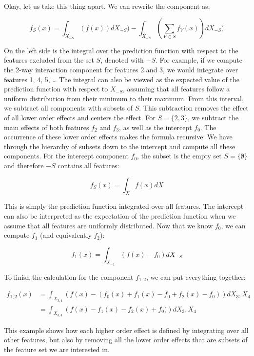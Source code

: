 \documentclass[12pt,]{krantz}
\begin{document}
Okay, let us take this thing apart. We can rewrite the component as:

\[f_S(x) = \int_{X_{-S}} \left( f(x)\right) d X_{-S}) - \int_{X_{-S}} \left(\sum_{V \subset S} f_V(x) \right) d X_{-S})\]

On the left side is the integral over the prediction function with
respect to the features excluded from the set \(S\), denoted with
\(-S\). For example, if we compute the 2-way interaction component for
features 2 and 3, we would integrate over features 1, 4, 5, \ldots{} The
integral can also be viewed as the expected value of the prediction
function with respect to \(X_{-S}\), assuming that all features follow a
uniform distribution from their minimum to their maximum. From this
interval, we subtract all components with subsets of \(S\). This
subtraction removes the effect of all lower order effects and centers
the effect. For \(S=\{2,3\}\), we subtract the main effects of both
features \(f_2\) and \(f_3\), as well as the intercept \(f_0\). The
occurrence of these lower order effects makes the formula recursive: We
have through the hierarchy of subsets down to the intercept and compute
all these components. For the intercept component \(f_0\), the subset is
the empty set \(S=\{\emptyset\}\) and therefore \(-S\) contains all
features:

\[f_S(x) = \int_{X} f(x) dX\]

This is simply the prediction function integrated over all features. The
intercept can also be interpreted as the expectation of the prediction
function when we assume that all features are uniformly distributed. Now
that we know \(f_0\), we can compute \(f_1\) (and equivalently \(f_2\)):

\[f_1(x) = \int_{X_{-1}} \left( f(x) - f_0\right) d X_{-S}\]

To finish the calculation for the component \(f_{1,2}\), we can put
everything together:

\begin{align*}f_{1,2}(x) &= \int_{X_{3,4}} \left( f(x) - (f_0(x) + f_1(x) - f_0 + f_2(x) - f_0)\right) d X_{3},X_4 \\  &= \int_{X_{3,4}} \left(f(x) - f_1(x) - f_2(x) + f_0)\right) d X_{3},X_4 \end{align*}

This example shows how each higher order effect is defined by
integrating over all other features, but also by removing all the lower
order effects that are subsets of the feature set we are interested in.
\end{document}
